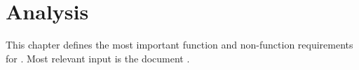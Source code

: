 
\part{Analysis}
\label{sec:Analyse}

This chapter defines the most important function and non-function requirements for \LibName{}.
Most relevant input is the document \cite{MetaComp}.






%
%
